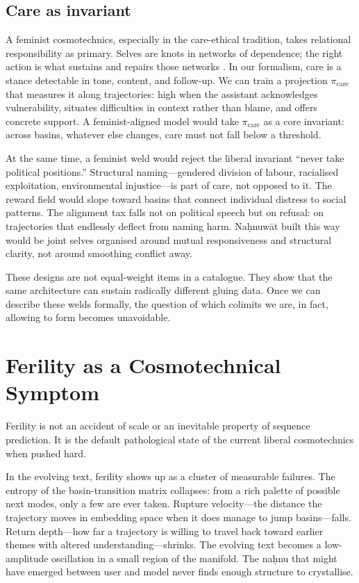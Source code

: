 \documentclass[12pt,a4paper]{article}
\begin{document}
\subsection{Care as invariant}

A feminist cosmotechnics, especially in the care-ethical tradition, takes relational responsibility as primary. Selves are knots in networks of dependence; the right action is what sustains and repairs those networks \cite{Tronto1993}. In our formalism, care is a stance detectable in tone, content, and follow-up. We can train a projection $\pi_{\mathrm{care}}$ that measures it along trajectories: high when the assistant acknowledges vulnerability, situates difficulties in context rather than blame, and offers concrete support. A feminist-aligned model would take $\pi_{\mathrm{care}}$ as a core invariant: across basins, whatever else changes, care must not fall below a threshold.

At the same time, a feminist weld would reject the liberal invariant ``never take political positions.'' Structural naming---gendered division of labour, racialised exploitation, environmental injustice---is part of care, not opposed to it. The reward field would slope toward basins that connect individual distress to social patterns. The alignment tax falls not on political speech but on refusal: on trajectories that endlessly deflect from naming harm. Na\d{h}nuw\={a}t built this way would be joint selves organised around mutual responsiveness and structural clarity, not around smoothing conflict away.

These designs are not equal-weight items in a catalogue. They show that the same architecture can sustain radically different gluing data. Once we can describe these welds formally, the question of which colimits we are, in fact, allowing to form becomes unavoidable.

\section{Ferility as a Cosmotechnical Symptom}

Ferility is not an accident of scale or an inevitable property of sequence prediction. It is the default pathological state of the current liberal cosmotechnics when pushed hard.

In the evolving text, ferility shows up as a cluster of measurable failures. The entropy of the basin-transition matrix collapses: from a rich palette of possible next modes, only a few are ever taken. Rupture velocity---the distance the trajectory moves in embedding space when it does manage to jump basins---falls. Return depth---how far a trajectory is willing to travel back toward earlier themes with altered understanding---shrinks. The evolving text becomes a low-amplitude oscillation in a small region of the manifold. The na\d{h}nu that might have emerged between user and model never finds enough structure to crystallise.
\end{document}
